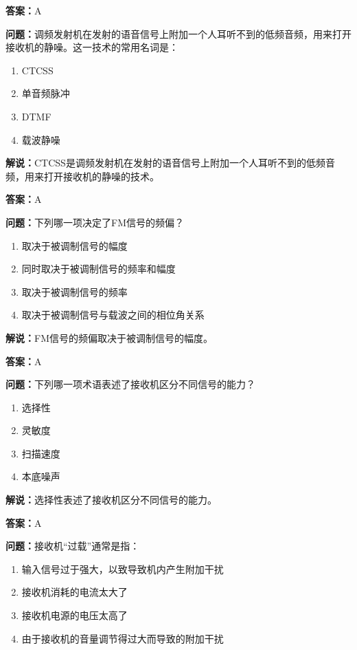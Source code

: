 \documentclass[UTF8]{ctexbook}
\begin{document}
\textbf{答案：}A

\textbf{问题：}调频发射机在发射的语音信号上附加一个人耳听不到的低频音频，用来打开接收机的静噪。这一技术的常用名词是：

\begin{enumerate}[label=\Alph*), leftmargin=3em]
  \item CTCSS
  \item 单音频脉冲
  \item DTMF
  \item 载波静噪
\end{enumerate}

\textbf{解说：}CTCSS是调频发射机在发射的语音信号上附加一个人耳听不到的低频音频，用来打开接收机的静噪的技术。%

\textbf{答案：}A

\textbf{问题：}下列哪一项决定了FM信号的频偏？

\begin{enumerate}[label=\Alph*), leftmargin=3em]
  \item 取决于被调制信号的幅度
  \item 同时取决于被调制信号的频率和幅度
  \item 取决于被调制信号的频率
  \item 取决于被调制信号与载波之间的相位角关系
\end{enumerate}

\textbf{解说：}FM信号的频偏取决于被调制信号的幅度。%

\textbf{答案：}A

\textbf{问题：}下列哪一项术语表述了接收机区分不同信号的能力？

\begin{enumerate}[label=\Alph*), leftmargin=3em]
  \item 选择性
  \item 灵敏度
  \item 扫描速度
  \item 本底噪声
\end{enumerate}

\textbf{解说：}选择性表述了接收机区分不同信号的能力。%

\textbf{答案：}A

\textbf{问题：}接收机“过载”通常是指：

\begin{enumerate}[label=\Alph*), leftmargin=3em]
  \item 输入信号过于强大，以致导致机内产生附加干扰
  \item 接收机消耗的电流太大了
  \item 接收机电源的电压太高了
  \item 由于接收机的音量调节得过大而导致的附加干扰
\end{enumerate}
\end{document}
